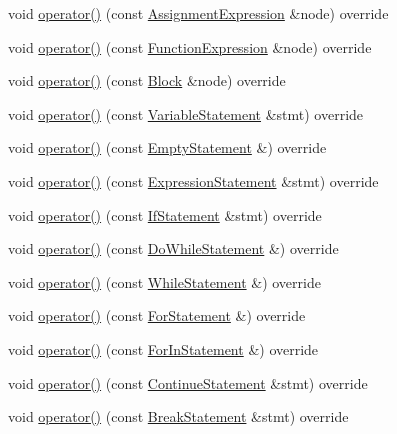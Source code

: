 \begin{DoxyCompactItemize}
\item 
void \hyperlink{struct_basic_visitor_a8b5be95fdf83d05891a738923bace2be}{operator()} (const \hyperlink{struct_assignment_expression}{Assignment\+Expression} \&node) override
\item 
void \hyperlink{struct_basic_visitor_ae6e86620ac38764d055615b005b7a1d4}{operator()} (const \hyperlink{struct_function_expression}{Function\+Expression} \&node) override
\item 
void \hyperlink{struct_basic_visitor_a6ab713b4b992eb420c89a2326e351fd3}{operator()} (const \hyperlink{struct_block}{Block} \&node) override
\item 
void \hyperlink{struct_basic_visitor_afb110c94ddb7c8383f03541c76ff8bf7}{operator()} (const \hyperlink{struct_variable_statement}{Variable\+Statement} \&stmt) override
\item 
void \hyperlink{struct_basic_visitor_a99efd6097eb643d8738f1bb42f51f17e}{operator()} (const \hyperlink{struct_empty_statement}{Empty\+Statement} \&) override
\item 
void \hyperlink{struct_basic_visitor_a6c369f60a28dffd5149258e32a81cb6e}{operator()} (const \hyperlink{struct_expression_statement}{Expression\+Statement} \&stmt) override
\item 
void \hyperlink{struct_basic_visitor_a4d4e3621e47ea469c0e59d0b1c6c657b}{operator()} (const \hyperlink{struct_if_statement}{If\+Statement} \&stmt) override
\item 
void \hyperlink{struct_basic_visitor_a51de918d2508db22dba21233582f670e}{operator()} (const \hyperlink{struct_do_while_statement}{Do\+While\+Statement} \&) override
\item 
void \hyperlink{struct_basic_visitor_a0a7f4e29df8d0725070caa8560d4c4b5}{operator()} (const \hyperlink{struct_while_statement}{While\+Statement} \&) override
\item 
void \hyperlink{struct_basic_visitor_a62043123e2fb7e0c22229b0e5bb7dcc8}{operator()} (const \hyperlink{struct_for_statement}{For\+Statement} \&) override
\item 
void \hyperlink{struct_basic_visitor_abfa9eb036c3927634be4aef270579672}{operator()} (const \hyperlink{struct_for_in_statement}{For\+In\+Statement} \&) override
\item 
void \hyperlink{struct_basic_visitor_a5614facf759b3aa15b518df911cd9a6c}{operator()} (const \hyperlink{struct_continue_statement}{Continue\+Statement} \&stmt) override
\item 
void \hyperlink{struct_basic_visitor_ae0ecf9dc46dc7654488a1b2002dceb25}{operator()} (const \hyperlink{struct_break_statement}{Break\+Statement} \&stmt) override

\end{DoxyCompactItemize}

